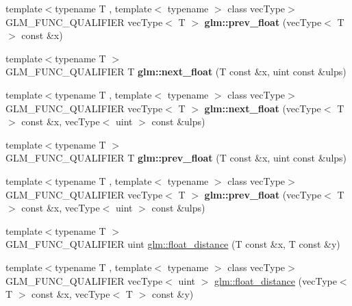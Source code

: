\begin{DoxyCompactItemize}
\item 
\hypertarget{namespaceglm_a4a3004a3bd03071cb376a2c8ece474cd}{}{\footnotesize template$<$typename T , template$<$ typename $>$ class vec\+Type$>$ }\\G\+L\+M\+\_\+\+F\+U\+N\+C\+\_\+\+Q\+U\+A\+L\+I\+F\+I\+E\+R vec\+Type$<$ T $>$ {\bfseries glm\+::prev\+\_\+float} (vec\+Type$<$ T $>$ const \&x)\label{namespaceglm_a4a3004a3bd03071cb376a2c8ece474cd}

\item 
\hypertarget{namespaceglm_ae4ffae05b7502be722f522c04f7e42ac}{}{\footnotesize template$<$typename T $>$ }\\G\+L\+M\+\_\+\+F\+U\+N\+C\+\_\+\+Q\+U\+A\+L\+I\+F\+I\+E\+R T {\bfseries glm\+::next\+\_\+float} (T const \&x, uint const \&ulps)\label{namespaceglm_ae4ffae05b7502be722f522c04f7e42ac}

\item 
\hypertarget{namespaceglm_ad02e8fdb69b2d630274d1942c0fbda04}{}{\footnotesize template$<$typename T , template$<$ typename $>$ class vec\+Type$>$ }\\G\+L\+M\+\_\+\+F\+U\+N\+C\+\_\+\+Q\+U\+A\+L\+I\+F\+I\+E\+R vec\+Type$<$ T $>$ {\bfseries glm\+::next\+\_\+float} (vec\+Type$<$ T $>$ const \&x, vec\+Type$<$ uint $>$ const \&ulps)\label{namespaceglm_ad02e8fdb69b2d630274d1942c0fbda04}

\item 
\hypertarget{namespaceglm_a87ac8f75510274e112fe8512cfaa6935}{}{\footnotesize template$<$typename T $>$ }\\G\+L\+M\+\_\+\+F\+U\+N\+C\+\_\+\+Q\+U\+A\+L\+I\+F\+I\+E\+R T {\bfseries glm\+::prev\+\_\+float} (T const \&x, uint const \&ulps)\label{namespaceglm_a87ac8f75510274e112fe8512cfaa6935}

\item 
\hypertarget{namespaceglm_ac0d81c9494fb335267d7211acb0e9ea4}{}{\footnotesize template$<$typename T , template$<$ typename $>$ class vec\+Type$>$ }\\G\+L\+M\+\_\+\+F\+U\+N\+C\+\_\+\+Q\+U\+A\+L\+I\+F\+I\+E\+R vec\+Type$<$ T $>$ {\bfseries glm\+::prev\+\_\+float} (vec\+Type$<$ T $>$ const \&x, vec\+Type$<$ uint $>$ const \&ulps)\label{namespaceglm_ac0d81c9494fb335267d7211acb0e9ea4}

\item 
{\footnotesize template$<$typename T $>$ }\\G\+L\+M\+\_\+\+F\+U\+N\+C\+\_\+\+Q\+U\+A\+L\+I\+F\+I\+E\+R uint \hyperlink{group__gtc__ulp_ga0c49c371f6b2adf02d03661e0f2499c9}{glm\+::float\+\_\+distance} (T const \&x, T const \&y)
\item 
{\footnotesize template$<$typename T , template$<$ typename $>$ class vec\+Type$>$ }\\G\+L\+M\+\_\+\+F\+U\+N\+C\+\_\+\+Q\+U\+A\+L\+I\+F\+I\+E\+R vec\+Type$<$ uint $>$ \hyperlink{group__gtc__ulp_ga9b2de9eb54e59f20b20f7eccd40d435e}{glm\+::float\+\_\+distance} (vec\+Type$<$ T $>$ const \&x, vec\+Type$<$ T $>$ const \&y)
\end{DoxyCompactItemize}


